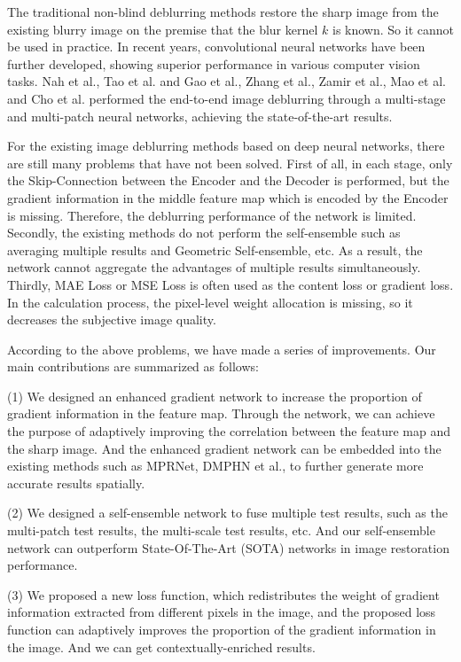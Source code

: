 \begin{sloppypar}
The traditional non-blind deblurring methods\cite{2} restore the sharp image from the existing blurry image on the premise that the blur kernel $k$ is known. So it cannot be used in practice. In recent years, convolutional neural networks have been further developed, showing superior performance in various computer vision tasks. Nah et al.\cite{3}, Tao et al.\cite{4} and Gao et al.\cite{5}, Zhang et al.\cite{6}, Zamir et al.\cite{7}, Mao et al.\cite{8} and Cho et al.\cite{9} performed the end-to-end image deblurring through a multi-stage and multi-patch neural networks, achieving the state-of-the-art results.

For the existing image deblurring methods based on deep neural networks, there are still many problems that have not been solved. First of all, in each stage, only the Skip-Connection between the Encoder and the Decoder is performed, but the gradient information in the middle feature map which is encoded by the Encoder is missing. Therefore, the deblurring performance of the network is limited. Secondly, the existing methods do not perform the self-ensemble such as averaging multiple results and Geometric Self-ensemble, etc. As a result, the network cannot aggregate the advantages of multiple results simultaneously. Thirdly, MAE Loss or MSE Loss is often used as the content loss or gradient loss. In the calculation process, the pixel-level weight allocation is missing, so it decreases the subjective image quality.

According to the above problems, we have made a series of improvements. Our main contributions are summarized as follows:

(1) We designed an enhanced gradient network to increase the proportion of gradient information in the feature map. Through the network, we can achieve the purpose of adaptively improving the correlation between the feature map and the sharp image. And the enhanced gradient network can be embedded into the existing methods such as MPRNet\cite{7}, DMPHN\cite{6} et al., to further generate more accurate results spatially.

(2) We designed a self-ensemble network to fuse multiple test results, such as the multi-patch test results, the multi-scale test results, etc. And our self-ensemble network can outperform State-Of-The-Art (SOTA) networks in image restoration performance.

(3) We proposed a new loss function, which redistributes the weight of gradient information extracted from different pixels in the image, and the proposed loss function can adaptively improves the proportion of the gradient information in the image. And we can get contextually-enriched results.


\end{sloppypar}
